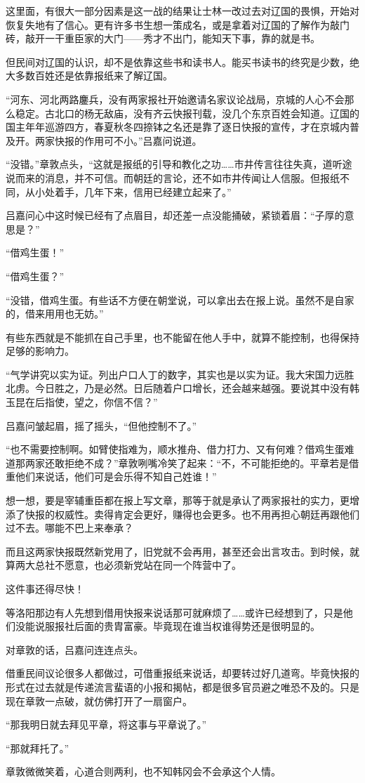 这里面，有很大一部分因素是这一战的结果让士林一改过去对辽国的畏惧，开始对恢复失地有了信心。更有许多书生想一策成名，或是拿着对辽国的了解作为敲门砖，敲开一干重臣家的大门——秀才不出门，能知天下事，靠的就是书。

但民间对辽国的认识，却不是依靠这些书和读书人。能买书读书的终究是少数，绝大多数百姓还是依靠报纸来了解辽国。

“河东、河北两路鏖兵，没有两家报社开始邀请名家议论战局，京城的人心不会那么稳定。古北口的杨无敌庙，没有齐云快报刊载，没几个东京百姓会知道。辽国的国主年年巡游四方，春夏秋冬四捺钵之名还是靠了逐日快报的宣传，才在京城内普及开。两家快报的作用可不小。”吕嘉问说道。

“没错。”章敦点头，“这就是报纸的引导和教化之功……市井传言往往失真，道听途说而来的消息，并不可信。而朝廷的言论，还不如市井传闻让人信服。但报纸不同，从小处着手，几年下来，信用已经建立起来了。”

吕嘉问心中这时候已经有了点眉目，却还差一点没能捅破，紧锁着眉：“子厚的意思是？”

“借鸡生蛋！”

“借鸡生蛋？”

“没错，借鸡生蛋。有些话不方便在朝堂说，可以拿出去在报上说。虽然不是自家的，借来用用也无妨。”

有些东西就是不能抓在自己手里，也不能留在他人手中，就算不能控制，也得保持足够的影响力。

“气学讲究以实为证。列出户口人丁的数字，其实也是以实为证。我大宋国力远胜北虏。今日胜之，乃是必然。日后随着户口增长，还会越来越强。要说其中没有韩玉昆在后指使，望之，你信不信？”

吕嘉问皱起眉，摇了摇头，“但他控制不了。”

“也不需要控制啊。如臂使指难为，顺水推舟、借力打力、又有何难？借鸡生蛋难道那两家还敢拒绝不成？”章敦咧嘴冷笑了起来：“不，不可能拒绝的。平章若是借重他们来说话，他们可是会乐得不知自己姓谁！”

想一想，要是宰辅重臣都在报上写文章，那等于就是承认了两家报社的实力，更增添了快报的权威性。卖得肯定会更好，赚得也会更多。也不用再担心朝廷再跟他们过不去。哪能不巴上来奉承？

而且这两家快报既然新党用了，旧党就不会再用，甚至还会出言攻击。到时候，就算两大总社不愿意，也必须新党站在同一个阵营中了。

这件事还得尽快！

等洛阳那边有人先想到借用快报来说话那可就麻烦了……或许已经想到了，只是他们没能说服报社后面的贵胄富豪。毕竟现在谁当权谁得势还是很明显的。

对章敦的话，吕嘉问连连点头。

借重民间议论很多人都做过，可借重报纸来说话，却要转过好几道弯。毕竟快报的形式在过去就是传递流言蜚语的小报和揭帖，都是很多官员避之唯恐不及的。只是现在章敦一点破，就仿佛打开了一扇窗户。

“那我明日就去拜见平章，将这事与平章说了。”

“那就拜托了。”

章敦微微笑着，心道合则两利，也不知韩冈会不会承这个人情。
